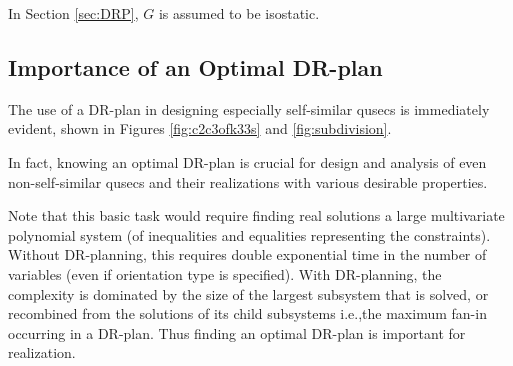





\noindent
\note In Section \ref{sec:DRP}, $G$ is assumed to be isostatic.


\subsection{Importance of an Optimal DR-plan}
The use of a DR-plan in designing especially self-similar qusecs is
immediately evident, shown in Figures \ref{fig:c2c3ofk33s} and
\ref{fig:subdivision}.

In fact, knowing an optimal DR-plan is crucial for
design and analysis of even non-self-similar qusecs and their
realizations with various desirable properties.

\medskip\noindent
{}
Note that this basic task
would require finding real solutions a large multivariate polynomial
system (of inequalities and equalities representing the constraints).
Without DR-planning, this requires double exponential time in the
number of variables (even if orientation type is specified). With
DR-planning, the complexity is dominated by the size of the largest
subsystem that is solved, or recombined from the solutions of its
child subsystems i.e.,the maximum fan-in occurring in a DR-plan. Thus
finding an optimal DR-plan is important for realization.

